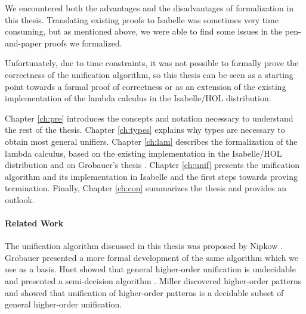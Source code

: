 We encountered both the advantages and the disadvantages of formalization in this thesis. Translating existing proofs to Isabelle was sometimes very time consuming, but as mentioned above, we were able to find some issues in the pen-and-paper proofs we formalized.

Unfortunately, due to time constraints, it was not possible to formally prove the correctness of the unification algorithm, so this thesis can be seen as a starting point towards a formal proof of correctness or as an extension of the existing implementation of the lambda calculus in the Isabelle\slash HOL distribution.

Chapter \ref{ch:pre} introduces the concepts and notation necessary to understand the rest of the thesis. Chapter \ref{ch:types} explains why types are necessary to obtain most general unifiers. Chapter \ref{ch:lam} describes the formalization of the lambda calculus, based on the existing implementation in the Isabelle\slash HOL distribution and on Grobauer's thesis \cite{Grobauer}. Chapter \ref{ch:unif} presents the unification algorithm and its implementation in Isabelle and the first steps towards proving termination. Finally, Chapter \ref{ch:con} summarizes the thesis and provides an outlook.

\paragraph{Related Work}
The unification algorithm discussed in this thesis was proposed by Nipkow \cite{Nipkow-LICS-93}. Grobauer \cite{Grobauer} presented a more formal development of the same algorithm which we use as a basis. Huet \cite{Huet_1973} showed that general higher-order unification is undecidable and presented a semi-decision algorithm \cite{HUET197527}. Miller \cite{10.1007/BFb0038698} discovered higher-order patterns and showed that unification of higher-order patterns is a decidable subset of general higher-order unification.